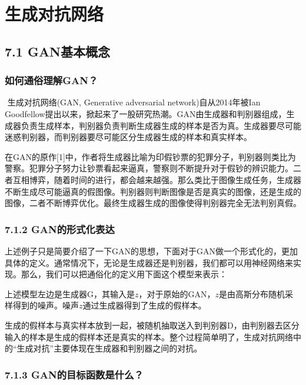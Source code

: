 \chapter{生成对抗网络}\label{ux7b2cux4e03ux7ae0-ux751fux6210ux5bf9ux6297ux7f51ux7edc}

\section{7.1 GAN基本概念}\label{ganux57faux672cux6982ux5ff5}

\subsection{如何通俗理解GAN？}\label{ux5982ux4f55ux901aux4fd7ux7406ux89e3gan}

​ 生成对抗网络(GAN, Generative adversarial network)自从2014年被Ian
Goodfellow提出以来，掀起来了一股研究热潮。GAN由生成器和判别器组成，生成器负责生成样本，判别器负责判断生成器生成的样本是否为真。生成器要尽可能迷惑判别器，而判别器要尽可能区分生成器生成的样本和真实样本。

​
在GAN的原作{[}1{]}中，作者将生成器比喻为印假钞票的犯罪分子，判别器则类比为警察。犯罪分子努力让钞票看起来逼真，警察则不断提升对于假钞的辨识能力。二者互相博弈，随着时间的进行，都会越来越强。那么类比于图像生成任务，生成器不断生成尽可能逼真的假图像。判别器则判断图像是否是真实的图像，还是生成的图像，二者不断博弈优化。最终生成器生成的图像使得判别器完全无法判别真假。

\subsection{7.1.2
GAN的形式化表达}\label{ganux7684ux5f62ux5f0fux5316ux8868ux8fbe}

​
上述例子只是简要介绍了一下GAN的思想，下面对于GAN做一个形式化的，更加具体的定义。通常情况下，无论是生成器还是判别器，我们都可以用神经网络来实现。那么，我们可以把通俗化的定义用下面这个模型来表示：

​
上述模型左边是生成器G，其输入是\(z\)，对于原始的GAN，\(z\)是由高斯分布随机采样得到的噪声。噪声\(z\)通过生成器得到了生成的假样本。

​
生成的假样本与真实样本放到一起，被随机抽取送入到判别器D，由判别器去区分输入的样本是生成的假样本还是真实的样本。整个过程简单明了，生成对抗网络中的``生成对抗''主要体现在生成器和判别器之间的对抗。

\subsection{7.1.3
GAN的目标函数是什么？}\label{ganux7684ux76eeux6807ux51fdux6570ux662fux4ec0ux4e48}

